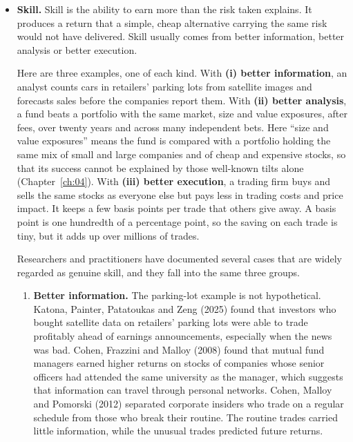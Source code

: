 \begin{itemize}
  \item \textbf{Skill.} Skill is the ability to earn more than the risk taken
  explains. It produces a return that a simple, cheap alternative carrying the
  same risk would not have delivered. Skill usually comes from better
  information, better analysis or better execution.

  Here are three examples, one of each kind. 
  With \textbf{(i) better
  information}, an analyst counts cars in retailers' parking lots from
  satellite images and forecasts sales before the companies report them.
  With \textbf{(ii) better analysis}, a fund beats a portfolio with the same
  market, size and value exposures, after fees, over twenty years and across
  many independent bets. Here ``size and value exposures'' means the fund is
  compared with a portfolio holding the same mix of small and large companies
  and of cheap and expensive stocks, so that its success cannot be explained
  by those well-known tilts alone (Chapter~\ref{ch:04}).
  With \textbf{(iii) better execution}, a trading firm
  buys and sells the same stocks as everyone else but pays less in trading
  costs and price impact. It keeps a few basis points per trade that others
  give away. A basis point is one hundredth of a percentage point, so the
  saving on each trade is tiny, but it adds up over millions of trades.

  
  Researchers and practitioners have documented several cases that are widely
  regarded as genuine skill, and they fall into the same three groups.
  
  \begin{enumerate}
    \item \textbf{Better information.} The parking-lot example is not hypothetical.
  Katona, Painter, Patatoukas and Zeng (2025) found that investors who bought
  satellite data on retailers' parking lots were able to trade profitably
  ahead of earnings announcements, especially when the news was bad. Cohen,
  Frazzini and Malloy (2008) found that mutual fund managers earned higher
  returns on stocks of companies whose senior officers had attended the same
  university as the manager, which suggests that information can travel
  through personal networks. Cohen, Malloy and Pomorski (2012) separated
  corporate insiders who trade on a regular schedule from those who break
  their routine. The routine trades carried little information, while the
  unusual trades predicted future returns.


\end{enumerate}
\end{itemize}
